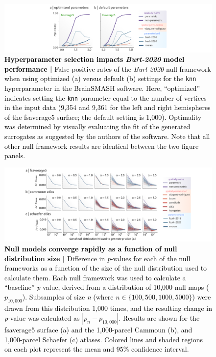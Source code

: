 \documentclass[12pt,aps,pra,reprint,showkeys]{revtex4-1}
\newcommand{\nimg}[1]{\textcolor{black}{{#1}}}
\begin{document}
\begin{figure}[htp]
  \begin{center}
    \centerline{\includegraphics[width=\textwidth]{burt2020_parameter_results.png}}
    \caption{
      \nimg{\textbf{Hyperparameter selection impacts \textit{Burt-2020} model performance |}
      False positive rates of the \textit{Burt-2020} null framework when using optimized (a) versus default (b) settings for the \texttt{knn} hyperparameter in the BrainSMASH software.
      Here, ``optimized'' indicates setting the \texttt{knn} parameter equal to the number of vertices in the input data (9,354 and 9,361 for the left and right hemispheres of the fsaverage5 surface; the default setting is 1,000).
      Optimality was determined by visually evaluating the fit of the generated surrogates as suggested by the authors of the software.
      Note that all other null framework results are identical between the two figure panels.}
    }
    \label{supp-figure-burt-parameters}
  \end{center}
\end{figure}

\begin{figure}[htp]
  \begin{center}
    \centerline{\includegraphics[width=\textwidth]{nnulls_results.png}}
    \caption{
      \nimg{\textbf{Null models converge rapidly as a function of null distribution size |}
      Difference in \emph{p}-values for each of the null frameworks as a function of the size of the null distribution used to calculate them.
      Each null framework was used to calculate a ``baseline'' \emph{p}-value, derived from a distribution of 10,000 null maps ($p_{10,000}$).
      Subsamples of size \emph{n} (where $n \in \{100, 500, 1000, 5000\}$) were drawn from this distribution 1,000 times, and the resulting change in \emph{p}-value was calculated as $| p_{n} - p_{10,000} |$.
      Results are shown for the fsaverage5 surface (a) and the 1,000-parcel Cammoun (b), and 1,000-parcel Schaefer (c) atlases.
      Colored lines and shaded regions on each plot represent the mean and 95\% confidence interval.}
    }
    \label{supp-figure-nnulls-results}
  \end{center}
\end{figure}
\end{document}

